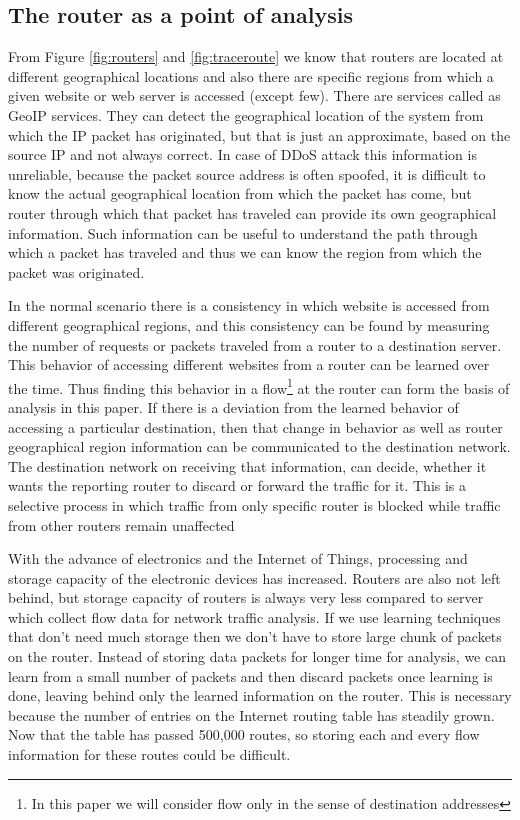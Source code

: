 \documentclass[12pt,oneside,a4paper]{article}
\begin{document}
\subsection{The router as a point of analysis}
From Figure \ref{fig:routers} and \ref{fig:traceroute} we know that routers are located at different geographical locations and also there are specific regions from which a given website or web server is accessed (except few). There are services called as GeoIP services. They can detect the geographical location of the system from which the IP packet has originated, but that is just an approximate, based on the source IP and not always correct. In case of DDoS attack this information is unreliable, because the packet source address is often spoofed, it is difficult to know the actual geographical location from which the packet has come, but router through which that packet has traveled can provide its own geographical information. Such information can be useful to understand the path through which a packet has traveled and thus we can know the region from which the packet was originated.\par

In the normal scenario there is a consistency in which website is accessed from different geographical regions, and this consistency can be found by measuring the number of requests or packets traveled from a router to a destination server. This behavior of accessing different websites from a router can be learned over the time. Thus finding this behavior in a flow\footnote{In this paper we will consider flow only in the sense of destination addresses} at the router can form the basis of analysis in this paper. If there is a deviation from the learned behavior of accessing a particular destination, then that change in behavior as well as router geographical region information can be communicated to the destination network. The destination network on receiving that information, can decide, whether it wants the reporting router to discard or forward the traffic for it. This is a selective process in which traffic from only specific router is blocked while traffic from other routers remain unaffected\par

With the advance of electronics and the Internet of Things, processing and storage capacity of the electronic devices has increased. Routers are also not left behind, but storage capacity of routers is always very less compared to server which collect flow data for network traffic analysis. If we use learning techniques that don't need much storage then we don't have to store large chunk of packets on the router. Instead of storing data packets for longer time for analysis, we can learn from a small number of packets and then discard packets once learning is done, leaving behind only the learned information on the router. This is necessary because the number of entries on the Internet routing table has steadily grown. Now that the table has passed 500,000 routes\cite{routing-tablesize}, so storing each and every flow information for these routes could be difficult.\par
\end{document}
